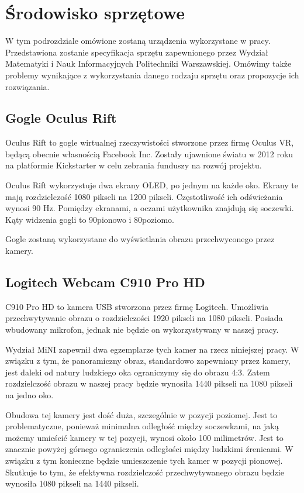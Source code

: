 \documentclass[a4paper,11pt,twoside]{report}
\theoremstyle{definition}
\begin{document}
\section{Środowisko sprzętowe}
W tym podrozdziale omówione zostaną urządzenia wykorzystane w pracy. Przedstawiona zostanie specyfikacja sprzętu zapewnionego przez Wydział Matematyki i Nauk Informacyjnych Politechniki Warszawskiej. Omówimy także problemy wynikające z wykorzystania danego rodzaju sprzętu oraz propozycje ich rozwiązania.

\subsection{Gogle Oculus Rift}
Oculus Rift to gogle wirtualnej rzeczywistości stworzone przez firmę Oculus VR, będącą obecnie własnością Facebook Inc. Zostały ujawnione światu w 2012 roku na platformie Kickstarter w celu zebrania funduszy na rozwój projektu. 

Oculus Rift wykorzystuje dwa ekrany OLED, po jednym na każde oko. Ekrany te mają rozdzielczość 1080 pikseli na 1200 pikseli. Częstotliwość ich odświeżania wynosi 90 Hz. Pomiędzy ekranami, a oczami użytkownika znajdują się soczewki. Kąty widzenia gogli to 90\textdegree  pionowo i 80\textdegree  poziomo.

Gogle zostaną wykorzystane do wyświetlania obrazu przechwyconego przez kamery.

\subsection{Logitech Webcam C910 Pro HD}
C910 Pro HD to kamera USB stworzona przez firmę Logitech. Umożliwia przechwytywanie obrazu o rozdzielczości 1920 pikseli na 1080 pikseli. Posiada wbudowany mikrofon, jednak nie będzie on wykorzystywany w naszej pracy.

Wydział MiNI zapewnił dwa egzemplarze tych kamer na rzecz niniejszej pracy. W związku z tym, że panoramiczny obraz, standardowo zapewniany przez kamery, jest daleki od natury ludzkiego oka ograniczymy się do obrazu 4:3. Zatem rozdzielczość obrazu w naszej pracy będzie wynosiła 1440 pikseli na 1080 pikseli na jedno oko.

Obudowa tej kamery jest dość duża, szczególnie w pozycji poziomej. Jest to problematyczne, ponieważ minimalna odległość między soczewkami, na jaką możemy umieścić kamery w tej pozycji, wynosi około 100 milimetrów. Jest to znacznie powyżej górnego ograniczenia odległości między ludzkimi źrenicami. W związku z tym konieczne będzie umieszczenie tych kamer w pozycji pionowej. Skutkuje to tym, że efektywna rozdzielczość przechwytywanego obrazu będzie wynosiła 1080 pikseli na 1440 pikseli.
\end{document}
